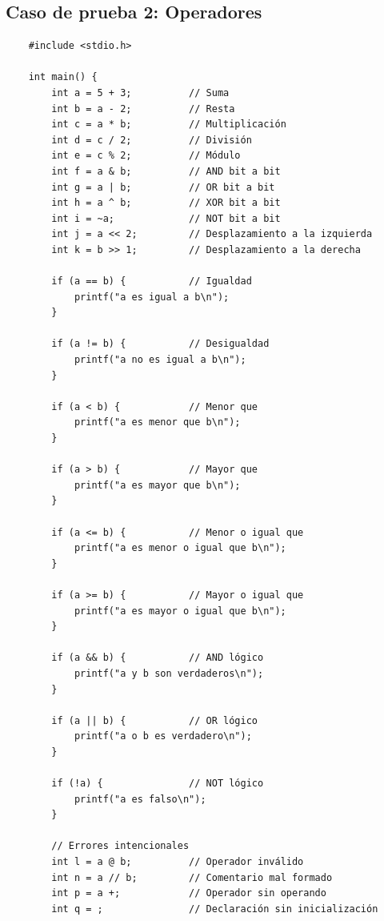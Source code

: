 \documentclass[a4paper,12pt]{article}
\begin{document}
\subsection*{Caso de prueba 2: Operadores}
\begin{flushleft}
    \begin{verbatim}
    #include <stdio.h>

    int main() {
        int a = 5 + 3;          // Suma
        int b = a - 2;          // Resta
        int c = a * b;          // Multiplicación
        int d = c / 2;          // División
        int e = c % 2;          // Módulo
        int f = a & b;          // AND bit a bit
        int g = a | b;          // OR bit a bit
        int h = a ^ b;          // XOR bit a bit
        int i = ~a;             // NOT bit a bit
        int j = a << 2;         // Desplazamiento a la izquierda
        int k = b >> 1;         // Desplazamiento a la derecha

        if (a == b) {           // Igualdad
            printf("a es igual a b\n");
        }

        if (a != b) {           // Desigualdad
            printf("a no es igual a b\n");
        }

        if (a < b) {            // Menor que
            printf("a es menor que b\n");
        }

        if (a > b) {            // Mayor que
            printf("a es mayor que b\n");
        }

        if (a <= b) {           // Menor o igual que
            printf("a es menor o igual que b\n");
        }

        if (a >= b) {           // Mayor o igual que
            printf("a es mayor o igual que b\n");
        }

        if (a && b) {           // AND lógico
            printf("a y b son verdaderos\n");
        }

        if (a || b) {           // OR lógico
            printf("a o b es verdadero\n");
        }

        if (!a) {               // NOT lógico
            printf("a es falso\n");
        }

        // Errores intencionales
        int l = a @ b;          // Operador inválido
        int n = a // b;         // Comentario mal formado
        int p = a +;            // Operador sin operando
        int q = ;               // Declaración sin inicialización


\end{verbatim}
\end{flushleft}
\end{document}
